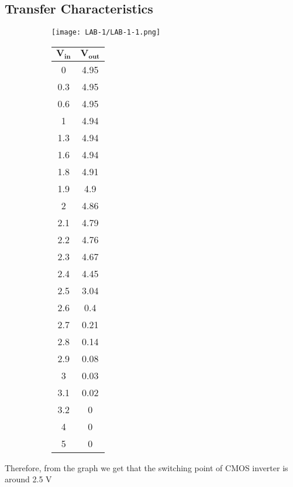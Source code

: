 \documentclass[12pt]{article}
\begin{document}
  \subsection{Transfer Characteristics}
  \begin{figure}[H]
    \begin{subfigure}{0.7\linewidth}
      \centering
      \texttt{[image: LAB-1/LAB-1-1.png]}
    \end{subfigure} 
    \begin{subfigure}{0.2\linewidth}
      \centering
      \begin{tabular}{|c|c|}
       \hline
       \bfseries $\mathbf{V_{in}}$	& \bfseries	$\mathbf{V_{out}}$	\\
       \hline
            0	&	4.95	\\
            0.3	&	4.95	\\
            0.6	&	4.95	\\
            1	&	4.94	\\
            1.3	&	4.94	\\
            1.6	&	4.94	\\
            1.8	&	4.91	\\
            1.9	&	4.9	    \\
            2	&	4.86	\\
            2.1	&	4.79	\\
            2.2	&	4.76	\\
            2.3	&	4.67	\\
            2.4	&	4.45	\\
            2.5	&	3.04	\\
            2.6	&	0.4	    \\
            2.7	&	0.21	\\
            2.8	&	0.14	\\
            2.9	&	0.08	\\
            3	&	0.03	\\
            3.1	&	0.02	\\
            3.2	&	0    	\\
            4	&	0   	\\
            5	&	0	    \\
           \hline
      \end{tabular}
    \end{subfigure} 
   \end{figure}

Therefore, from the graph we get that the switching point of CMOS inverter is around 2.5 V
\end{document}

